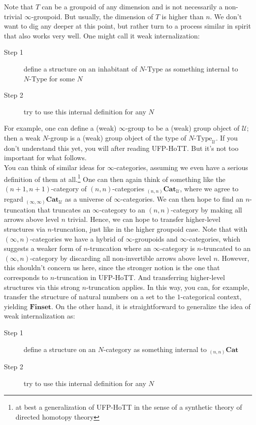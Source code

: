 Note that $T$ can be a groupoid of any dimension and is not necessarily a non-trivial $\infty$-groupoid.
But usually, the dimension of $T$ is higher than $n$.
We don't want to dig any deeper at this point, but rather turn to a process similar in spirit that also works very well.
One might call it weak internalization:
\begin{description}
\item[Step 1]
define a structure on an inhabitant of $N\textrm{-Type}$ as something internal to $N\textrm{-Type}$ for some $N$
\item[Step 2]
try to use this internal definition for any $N$
\end{description}
For example, one can define a (weak) $\infty$-group to be a (weak) group object of $\mathcal{U}$; then a weak $N$-group is a (weak) group object of the type of $N\textrm{-Type}_{\mathcal{U}}$.
If you don't understand this yet, you will after reading UFP-HoTT.
But it's not too important for what follows.
\\
You can think of similar ideas for $\infty$-categories, assuming we even have a serious definition of them at all.\footnote{at best a generalization of UFP-HoTT in the sense of a synthetic theory of directed homotopy theory}
One can then again think of something like the $(n+1,n+1)$-category of $(n,n)$-categories ${}_{(n,n)}\mathbf{Cat}_{\mathcal{U}}$, where we agree to regard ${}_{(\infty,\infty)}\mathbf{Cat}_{\mathcal{U}}$ as a universe of $\infty$-categories.
We can then hope to find an $n$-truncation that truncates an $\infty$-category to an $(n,n)$-category by making all arrows above level $n$ trivial.
Hence, we can hope to transfer higher-level structures via $n$-truncation, just like in the higher groupoid case.
Note that with $(\infty,n)$-categories we have a hybrid of $\infty$-groupoids and $\infty$-categories, which suggests a weaker form of $n$-truncation where an $\infty$-category is $n$-truncated to an $(\infty,n)$-category by discarding all non-invertible arrows above level $n$.
However, this shouldn't concern us here, since the stronger notion is the one that corresponds to $n$-truncation in UFP-HoTT.
And transferring higher-level structures via this strong $n$-truncation applies.
In this way, you can, for example, transfer the structure of natural numbers on a set to the $1$-categorical context, yielding $\mathbf{Finset}$.
On the other hand, it is straightforward to generalize the idea of weak internalization as:
\begin{description}
\item[Step 1]
define a structure on an $N$-category as something internal to ${}_{(n,n)}\mathbf{Cat}$
\item[Step 2]
try to use this internal definition for any $N$
\end{description}
